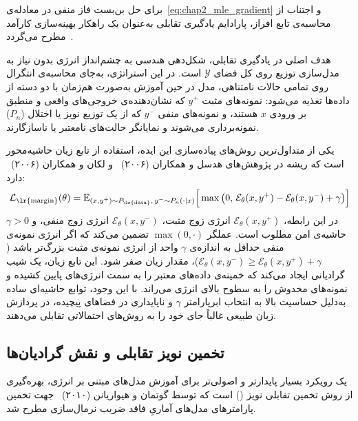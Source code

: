 برای حل بن‌بست فاز منفی در معادله‌ی~\ref{eq:chap2_mle_gradient} و اجتناب از محاسبه‌ی تابع افراز، پارادایم یادگیری تقابلی به‌عنوان یک راهکار بهینه‌سازی کارآمد مطرح می‌گردد~\cite{lecun2006tutorial}.

هدف اصلی در یادگیری تقابلی، شکل‌دهی هندسی به چشم‌انداز انرژی بدون نیاز به مدل‌سازی توزیع روی کل فضای $\mathcal{Y}$ است. در این استراتژی، به‌جای محاسبه‌ی انتگرال روی تمامی حالات نامتناهی، مدل در حین آموزش به‌صورت هم‌زمان با دو دسته از داده‌ها تغذیه می‌شود: نمونه‌های مثبت $y^+$ که نشان‌دهنده‌ی خروجی‌های واقعی و منطبق بر ورودی $x$ هستند، و نمونه‌های منفی $y^-$ که از یک توزیع نویز یا اختلال ($P_n$) نمونه‌برداری می‌شوند و نمایانگر حالت‌های نامعتبر یا ناسازگارند.

یکی از متداول‌ترین روش‌های پیاده‌سازی این ایده، استفاده از تابع زیان حاشیه‌محور است که ریشه در پژوهش‌های هدسل و همکاران (۲۰۰۶)~\cite{hadsell2006dimensionality} و لکان و همکاران (۲۰۰۶)~\cite{lecun2006tutorial} دارد:
\begin{equation}\label{eq:chap2_margin_loss}
    \mathcal{L}_{\text{\lr{margin}}}(\theta) = \mathbb{E}_{(x, y^+) \sim P_{\text{\lr{data}}}, \, y^- \sim P_n(\cdot \mid x)} \Big[ \max\big(0, \, \mathcal{E}_\theta(x, y^+) - \mathcal{E}_\theta(x, y^-) + \gamma\big) \Big]
\end{equation}
در این رابطه، $\mathcal{E}_\theta(x, y^+)$ انرژی زوج مثبت، $\mathcal{E}_\theta(x, y^-)$ انرژی زوج منفی، و $\gamma > 0$ حاشیه‌ی امن مطلوب است. عملگر $\max(0, \cdot)$ تضمین می‌کند که اگر انرژی نمونه‌ی منفی حداقل به اندازه‌ی $\gamma$ واحد از انرژی نمونه‌ی مثبت بزرگ‌تر باشد ($\mathcal{E}_\theta(x, y^-) \ge \mathcal{E}_\theta(x, y^+) + \gamma$)، مقدار زیان صفر شود. این تابع زیان، یک شیب گرادیانی ایجاد می‌کند که خمینه‌ی داده‌های معتبر را به سمت انرژی‌های پایین کشیده و نمونه‌های مخدوش را به سطوح بالای انرژی می‌راند. با این وجود، توابع حاشیه‌ای ساده به‌دلیل حساسیت بالا به انتخاب ابرپارامتر $\gamma$ و ناپایداری در فضاهای پیچیده، در پردازش زبان طبیعی غالباً جای خود را به روش‌های احتمالاتی تقابلی می‌دهند.


\subsection{تخمین نویز تقابلی و نقش گرادیان‌ها}\label{sec:2-4-5}

یک رویکرد بسیار پایدارتر و اصولی‌تر برای آموزش مدل‌های مبتنی بر انرژی، بهره‌گیری از روش تخمین تقابلی نویز () است که توسط گوتمان و هیواریانن (۲۰۱۰)~\cite{gutmann2010noise} جهت تخمین پارامترهای مدل‌های آماریِ فاقد ضریب نرمال‌سازی مطرح شد.

